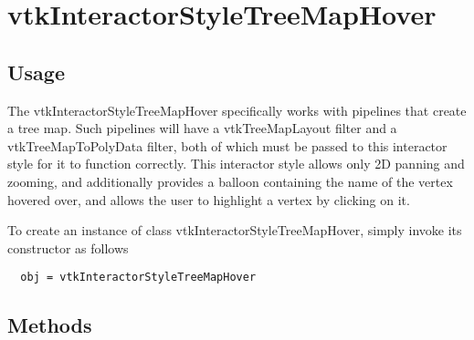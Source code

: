 \section{vtkInteractorStyleTreeMapHover}

\subsection{Usage}

 The vtkInteractorStyleTreeMapHover specifically works with pipelines
 that create a tree map.  Such pipelines will have a vtkTreeMapLayout
 filter and a vtkTreeMapToPolyData filter, both of which must be passed
 to this interactor style for it to function correctly.
 This interactor style allows only 2D panning and zooming, and additionally
 provides a balloon containing the name of the vertex hovered over,
 and allows the user to highlight a vertex by clicking on it.

To create an instance of class vtkInteractorStyleTreeMapHover, simply
invoke its constructor as follows
\begin{verbatim}
  obj = vtkInteractorStyleTreeMapHover
\end{verbatim}
\subsection{Methods}

